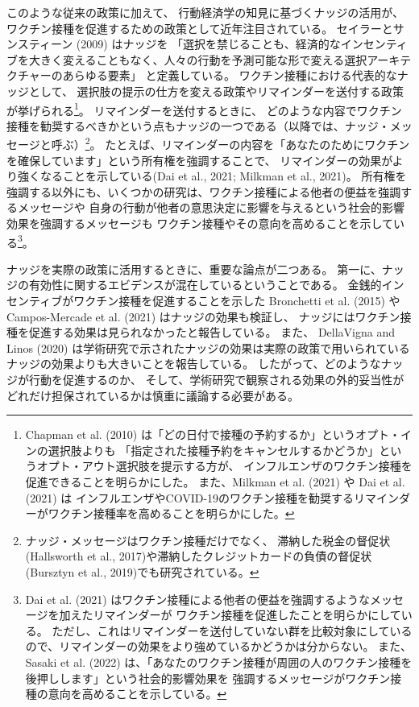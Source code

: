 \documentclass[
  11pt,
  a4paper,
]{article}
\begin{document}
このような従来の政策に加えて、
行動経済学の知見に基づくナッジの活用が、ワクチン接種を促進するための政策として近年注目されている。
セイラーとサンスティーン (2009) はナッジを
「選択を禁じることも、経済的なインセンティブを大きく変えることもなく、人々の行動を予測可能な形で変える選択アーキテクチャーのあらゆる要素」
と定義している。
ワクチン接種における代表的なナッジとして、
選択肢の提示の仕方を変える政策やリマインダーを送付する政策が挙げられる\footnote{Chapman et al. (2010) は「どの日付で接種の予約するか」というオプト・インの選択肢よりも
  「指定された接種予約をキャンセルするかどうか」というオプト・アウト選択肢を提示する方が、
  インフルエンザのワクチン接種を促進できることを明らかにした。
  また、Milkman et al. (2021) や Dai et al. (2021) は
  インフルエンザやCOVID-19のワクチン接種を勧奨するリマインダーがワクチン接種率を高めることを明らかにした。}。
リマインダーを送付するときに、
どのような内容でワクチン接種を勧奨するべきかという点もナッジの一つである（以降では、ナッジ・メッセージと呼ぶ）\footnote{ナッジ・メッセージはワクチン接種だけでなく、
  滞納した税金の督促状(Hallsworth et al., 2017)や滞納したクレジットカードの負債の督促状(Bursztyn et al., 2019)でも研究されている。}。
たとえば、リマインダーの内容を「あなたのためにワクチンを確保しています」という所有権を強調することで、
リマインダーの効果がより強くなることを示している(Dai et al., 2021; Milkman et al., 2021)。
所有権を強調する以外にも、いくつかの研究は、ワクチン接種による他者の便益を強調するメッセージや
自身の行動が他者の意思決定に影響を与えるという社会的影響効果を強調するメッセージも
ワクチン接種やその意向を高めることを示している\footnote{Dai et al. (2021) はワクチン接種による他者の便益を強調するようなメッセージを加えたリマインダーが
  ワクチン接種を促進したことを明らかにしている。
  ただし、これはリマインダーを送付していない群を比較対象にしているので、リマインダーの効果をより強めているかどうかは分からない。
  また、Sasaki et al. (2022) は、「あなたのワクチン接種が周囲の人のワクチン接種を後押しします」という社会的影響効果を
  強調するメッセージがワクチン接種の意向を高めることを示している。}。

ナッジを実際の政策に活用するときに、重要な論点が二つある。
第一に、ナッジの有効性に関するエビデンスが混在しているということである。
金銭的インセンティブがワクチン接種を促進することを示した
Bronchetti et al. (2015) や Campos-Mercade et al. (2021) はナッジの効果も検証し、
ナッジにはワクチン接種を促進する効果は見られなかったと報告している。
また、 DellaVigna and Linos (2020) は学術研究で示されたナッジの効果は実際の政策で用いられているナッジの効果よりも大きいことを報告している。
したがって、どのようなナッジが行動を促進するのか、
そして、学術研究で観察される効果の外的妥当性がどれだけ担保されているかは慎重に議論する必要がある。
\end{document}

